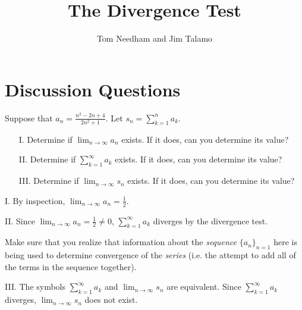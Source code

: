 \documentclass[noauthor]{ximera}
\author{Tom Needham and Jim Talamo}
\title[]{The Divergence Test}
\begin{document}
\begin{abstract}
\end{abstract}
\maketitle

\vspace{-0.9in}

\section{Discussion Questions}
\begin{problem}
Suppose that  $a_n = \frac{n^2-2n+4}{2n^2+1}$.  Let $s_n = \sum_{k=1}^n a_k$. 

\begin{itemize}
\item[I.] Determine if $\lim_{n \to \infty} a_n$ exists.  If it does, can you determine its value?
\item[II.] Determine if $\sum_{k=1}^{\infty} a_k$ exists.  If it does, can you determine its value?
\item[III.] Determine if $\lim_{n \to \infty} s_n$ exists.  If it does, can you determine its value?
\end{itemize}

\begin{freeResponse}
I. By inspection, $\lim_{n \to \infty} a_n = \frac{1}{2}$.

II. Since $\lim_{n \to \infty} a_n = \frac{1}{2} \neq 0$, $\sum_{k=1}^{\infty} a_k$ diverges by the divergence test.  

Make sure that you realize that information about the \emph{sequence} $\{a_n\}_{n=1}$ here is being used to determine convergence of the \emph{series} (i.e. the attempt to add all of the terms in the sequence together). 

III. The symbols $\sum_{k=1}^{\infty} a_k$ and $\lim_{n \to \infty} s_n$ are equivalent.  Since $\sum_{k=1}^{\infty} a_k$ diverges, $\lim_{n \to \infty} s_n$ does not exist.
\end{freeResponse}
\end{problem}


\end{document}

